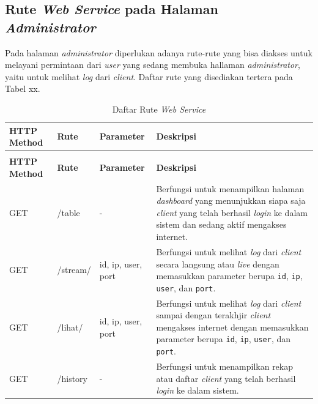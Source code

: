 \subsection{Rute \textit{Web Service} pada Halaman \textit{Administrator}}
Pada halaman \textit{administrator} diperlukan adanya rute-rute yang bisa diakses untuk melayani permintaan dari \textit{user} yang sedang membuka hallaman \textit{administrator}, yaitu untuk melihat \textit{log} dari \textit{client}. Daftar rute yang disediakan tertera pada Tabel xx.\\
\begin{longtable}{|p{}|p{}|p{}|p{}|} %
	
	\caption{Daftar Rute \textit{Web Service}} \label{tabelRuteWebServiceDockerHost} \\
	\hline
	\textbf{HTTP Method} & \textbf{Rute} & \textbf{Parameter} & \textbf{Deskripsi} \\ \hline
	
	\endfirsthead
	\caption[]{Daftar Rute \textit{Web Service}}  \\
	\hline
	\textbf{HTTP Method} & \textbf{Rute} & \textbf{Parameter} & \textbf{Deskripsi}  \\ \hline
	
	\endhead
	\endfoot
	\endlastfoot
	
	GET & /table & - & Berfungsi untuk menampilkan halaman \textit{dashboard} yang menunjukkan siapa saja \textit{client} yang telah berhasil \textit{login} ke dalam sistem dan sedang aktif mengakses internet.\\ \hline
	GET & /stream/ & id, ip, user, port & Berfungsi untuk melihat \textit{log} dari \textit{client} secara langsung atau \textit{live} dengan memasukkan parameter berupa \texttt{id}, \texttt{ip}, \texttt{user}, dan \texttt{port}.\\ \hline
	GET & /lihat/ & id, ip, user, port & Berfungsi untuk melihat \textit{log} dari \textit{client} sampai dengan terakhjir \textit{client} mengakses internet dengan memasukkan parameter berupa \texttt{id}, \texttt{ip}, \texttt{user}, dan \texttt{port}.\\ \hline
	GET & /history & - & Berfungsi untuk menampilkan rekap atau daftar \textit{client} yang telah berhasil \textit{login} ke dalam sistem.\\ \hline
\end{longtable}


